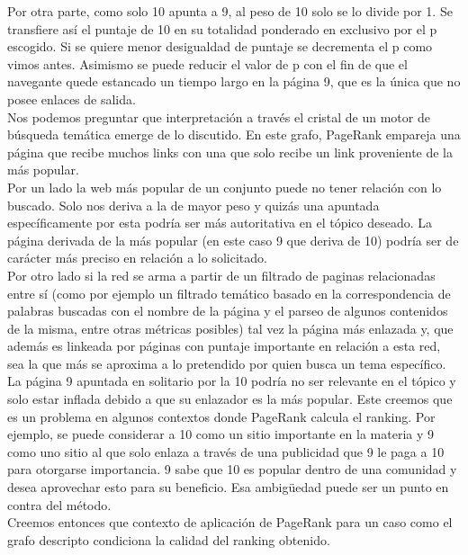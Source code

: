 Por otra parte, como solo 10 apunta a 9, al peso de 10 solo se lo divide por 1. Se transfiere así el puntaje de 10 en su totalidad ponderado en exclusivo por el p escogido. Si se quiere menor desigualdad de puntaje se decrementa el p como vimos antes. Asimismo se puede reducir el valor de p con el fin de que el navegante quede estancado un tiempo largo en la página 9, que es la única que no posee enlaces de salida. \\

Nos podemos preguntar que interpretación a través el cristal de un motor de búsqueda temática emerge de lo discutido. En este grafo, PageRank empareja una página que recibe muchos links con una que solo recibe un link proveniente de la más popular. \\ 
Por un lado la web más popular de un conjunto puede no tener relación con lo buscado. Solo nos deriva a la de mayor peso y quizás una apuntada específicamente por esta podría ser más autoritativa en el tópico deseado. La página derivada de la más popular (en este caso 9 que deriva de 10) podría ser de carácter más preciso en relación a lo solicitado.\\

Por otro lado si la red se arma a partir de un filtrado de paginas relacionadas entre sí (como por ejemplo un filtrado temático basado en la correspondencia de palabras buscadas con el nombre de la página y el parseo de algunos contenidos de la misma, entre otras métricas posibles) tal vez la página más enlazada y, que además es linkeada por páginas con puntaje importante en relación a esta red, sea la que más se aproxima a lo pretendido por quien busca un tema específico.\\

La página 9 apuntada en solitario por la 10 podría no ser relevante en el tópico y solo estar inflada debido a que su enlazador es la más popular. Este creemos que es un problema en algunos contextos donde PageRank calcula el ranking. Por ejemplo, se puede considerar a 10 como un sitio importante en la materia y 9 como uno sitio al que solo enlaza a través de una publicidad que 9 le paga a 10 para otorgarse importancia. 9 sabe que 10 es popular dentro de una comunidad y desea aprovechar esto para su beneficio. Esa ambigüedad puede ser un punto en contra del método.\\

Creemos entonces que contexto de aplicación de PageRank para un caso como el grafo descripto condiciona la calidad del ranking obtenido. \\

